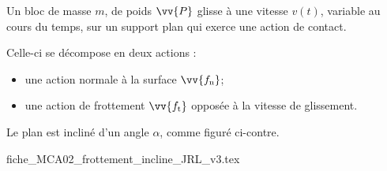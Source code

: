 \finEntrainement








\hauteurLargeurCadreReponse		{7mm}{5cm}
\typeEntrainement				{} %
\initialisationEntrainement


                                \initialisationPartieGauche %
Un bloc de masse $m$, de poids $\vv{P}$ glisse à une vitesse $v(t)$, variable au cours du temps, sur un support plan qui exerce une action de contact. 

Celle-ci se décompose en deux actions : 
\begin{itemize}
	\item une action normale à la surface $\vv{f_\text{n}}$;
	\item une action de frottement $\vv{f_\text{t}}$ opposée à la vitesse de glissement.
\end{itemize}

Le plan est incliné d'un angle $\alpha$, comme figuré ci-contre.
                                \initialisationPartieDroite %
\begin{center}
{fiche_MCA02_frottement_incline_JRL_v3.tex}
\end{center}
                               \finalisationDuPartageDePage %


